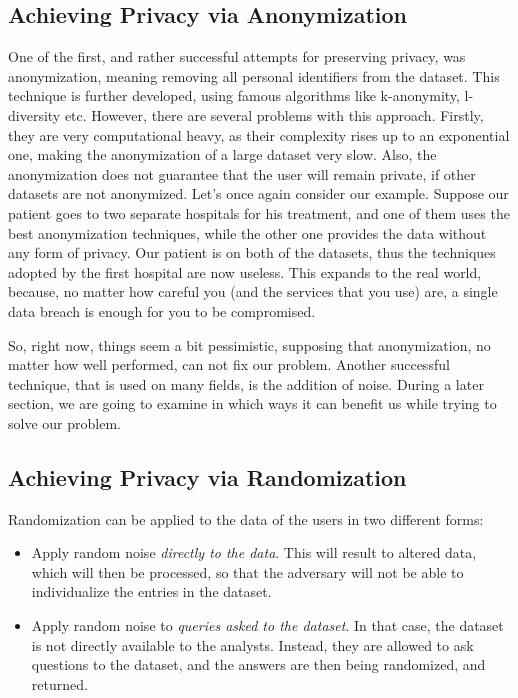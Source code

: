 \subsection{Achieving Privacy via Anonymization}

\par One of the first, and rather successful attempts for preserving privacy, was anonymization, meaning removing all personal identifiers from the dataset. This technique is further developed, using famous algorithms like k-anonymity, l-diversity etc. However, there are several problems with this approach. Firstly, they are very computational heavy, as their complexity rises up to an exponential one, making the anonymization of a large dataset very slow. Also, the anonymization does not guarantee that the user will remain private, if other datasets are not anonymized. Let's once again consider our example. Suppose our patient goes to two separate hospitals for his treatment, and one of them uses the best anonymization techniques, while the other one provides the data without any form of privacy. Our patient is on both of the datasets, thus the techniques adopted by the first hospital are now useless. This expands to the real world, because, no matter how careful you (and the services that you use) are, a single data breach is enough for you to be compromised. 

\par So, right now, things seem a bit pessimistic, supposing that anonymization, no matter how well performed, can not fix our problem. Another successful technique, that is used on many fields, is the addition of noise. During a later section, we are going to examine in which ways it can benefit us while trying to solve our problem.

\subsection{Achieving Privacy via Randomization}

Randomization can be applied to the data of the users in two different forms:
\begin{itemize}
    \item Apply random noise \emph{directly to the data}. This will result to altered data, which will then be processed, so that the adversary will not be able to individualize the entries in the dataset.
    \item Apply random noise to \emph{queries asked to the dataset}. In that case, the dataset is not directly available to the analysts. Instead, they are allowed to ask questions to the dataset, and the answers are then being randomized, and returned.
\end{itemize}

